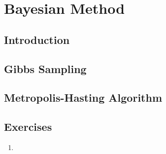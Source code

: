 
\chapter{Bayesian Method}
\label{chp:mcmc}


\section{Introduction}


\section{Gibbs Sampling}


\section{Metropolis-Hasting Algorithm}




\section{Exercises}
\label{sec:mle_exercise}

\begin{enumerate}[label=\thechapter-\arabic*]

\item


\end{enumerate}

